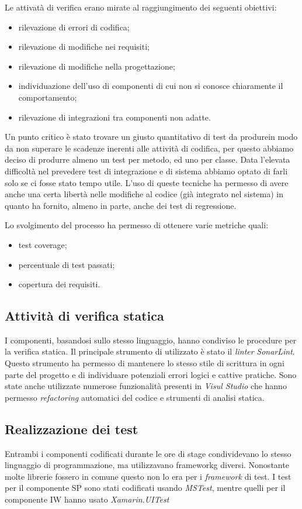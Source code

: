 Le attivatà di verifica erano mirate al raggiungimento dei seguenti obiettivi: 
\begin{itemize}
    \item rilevazione di errori di codifica;
    \item rilevazione di modifiche nei requisiti;
    \item rilevazione di modifiche nella progettazione;
    \item individuazione dell’uso di componenti di cui non si conosce chiaramente il comportamento;
    \item rilevazione di integrazioni tra componenti non adatte.
\end{itemize}
\medskip
Un punto critico è stato trovare un giusto quantitativo di test da produrein modo da non superare le scadenze inerenti alle attività di codifica, per questo abbiamo deciso di produrre almeno un test per metodo, ed uno per classe. 
Data l’elevata difficoltà nel prevedere test di integrazione e di sistema abbiamo optato di farli solo se ci fosse stato tempo utile. 
L'uso di queste tecniche ha permesso di avere anche una certa libertà nelle modifiche al codice (già integrato nel sistema) in quanto ha fornito, almeno in parte, anche dei test di regressione. 

Lo svolgimento del processo ha permesso di ottenere varie metriche quali:
\begin{itemize}
    \item test coverage;
    \item percentuale di test passati;
    \item copertura dei requisiti.
\end{itemize}

\subsection{Attività di verifica statica}
I componenti, basandosi sullo stesso linguaggio, hanno condiviso le procedure per la verifica statica. Il principale strumento di utilizzato è stato il \emph{linter} \emph{SonarLint}. Questo strumento ha permesso di mantenere lo stesso stile di scrittura in ogni parte del progetto e di individuare potenziali errori logici e cattive pratiche. 
Sono state anche utilizzate numerose funzionalità presenti in \emph{Visul Studio} che hanno permesso \emph{refactoring} automatici del codice e strumenti di analisi statica.

\subsection{Realizzazione dei test}
Entrambi i componenti codificati durante le ore di stage condividevano lo stesso linguaggio di programmazione, ma utilizzavano \gls{frameworkg} diversi. Nonostante molte librerie fossero in comune questo non lo era per i \emph{framework} di test. I test per il componente SP sono stati codificati usando \emph{MSTest}, mentre quelli per il componente IW hanno usato \emph{Xamarin.UITest}

